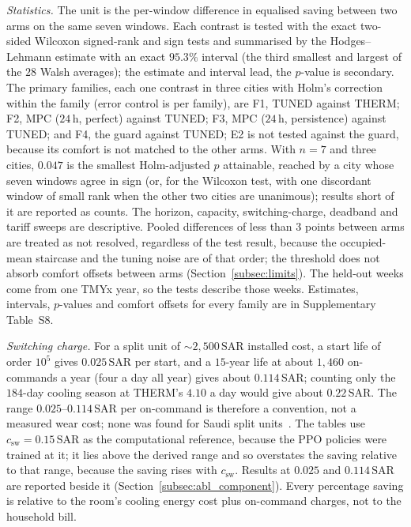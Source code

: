 \documentclass[3p,twocolumn,number]{elsarticle}
\newcommand{\csw}{c_{\mathrm{sw}}}
\newcommand{\SAR}{\text{SAR}}
\begin{document}
\emph{Statistics.} The unit is the per-window difference in equalised saving between two arms on the same seven windows. Each contrast is tested with the exact two-sided Wilcoxon signed-rank and sign tests and summarised by the Hodges--Lehmann estimate with an exact $95.3\%$ interval (the third smallest and largest of the $28$ Walsh averages); the estimate and interval lead, the $p$-value is secondary. The primary families, each one contrast in three cities with Holm's correction within the family (error control is per family), are F1, TUNED against THERM; F2, MPC ($24\,$h, perfect) against TUNED; F3, MPC ($24\,$h, persistence) against TUNED; and F4, the guard against TUNED; E2 is not tested against the guard, because its comfort is not matched to the other arms. With $n=7$ and three cities, $0.047$ is the smallest Holm-adjusted $p$ attainable, reached by a city whose seven windows agree in sign (or, for the Wilcoxon test, with one discordant window of small rank when the other two cities are unanimous); results short of it are reported as counts. The horizon, capacity, switching-charge, deadband and tariff sweeps are descriptive. Pooled differences of less than $3$ points between arms are treated as not resolved, regardless of the test result, because the occupied-mean staircase and the tuning noise are of that order; the threshold does not absorb comfort offsets between arms (Section~\ref{subsec:limits}). The held-out weeks come from one TMYx year, so the tests describe those weeks. Estimates, intervals, $p$-values and comfort offsets for every family are in Supplementary Table~S8.

\emph{Switching charge.} For a split unit of ${\sim}2{,}500\,\SAR$ installed cost, a start life of order $10^{5}$ gives $0.025\,\SAR$ per start, and a $15$-year life at about $1{,}460$ on-commands a year (four a day all year) gives about $0.114\,\SAR$; counting only the $184$-day cooling season at THERM's $4.10$ a day would give about $0.22\,\SAR$. The range $0.025$--$0.114\,\SAR$ per on-command is therefore a convention, not a measured wear cost; none was found for Saudi split units~\cite{Pang2011}. The tables use $\csw=0.15\,\SAR$ as the computational reference, because the PPO policies were trained at it; it lies above the derived range and so overstates the saving relative to that range, because the saving rises with $\csw$. Results at $0.025$ and $0.114\,\SAR$ are reported beside it (Section~\ref{subsec:abl_component}). Every percentage saving is relative to the room's cooling energy cost plus on-command charges, not to the household bill.
 
\end{document}
